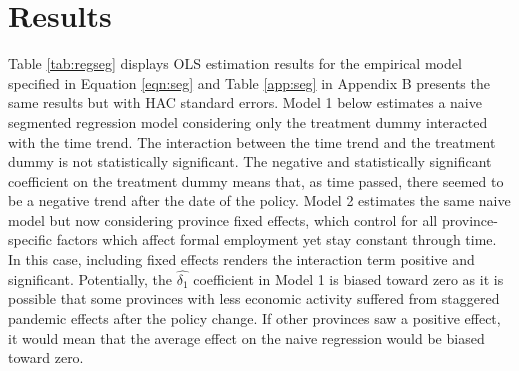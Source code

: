 \documentclass[11pt,a4paper]{article}\usepackage[]{graphicx}\usepackage[]{xcolor}
\begin{document}
\section{Results}
Table \ref{tab:regseg} displays OLS estimation results for the empirical model specified in Equation \ref{eqn:seg} and Table \ref{app:seg} in Appendix B presents the same results but with HAC standard errors. Model 1 below estimates a naive segmented regression model considering only the treatment dummy interacted with the time trend. The interaction between the time trend and the treatment dummy is not statistically significant. The negative and statistically significant coefficient on the treatment dummy means that, as time passed, there seemed to be a negative trend after the date of the policy. Model 2 estimates the same naive model but now considering province fixed effects, which control for all province-specific factors which affect formal employment yet stay constant through time. In this case, including fixed effects renders the interaction term positive and significant. Potentially, the $\hat{\delta_1}$ coefficient in Model 1 is biased toward zero as it is possible that some provinces with less economic activity suffered from staggered pandemic effects after the policy change. If other provinces saw a positive effect, it would mean that the average effect on the naive regression would be biased toward zero.
\end{document}
